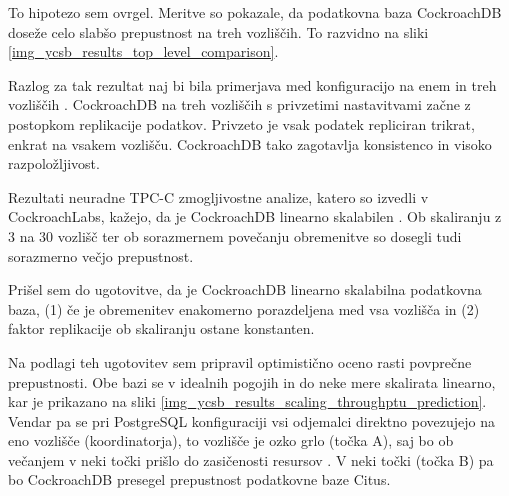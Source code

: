 \documentclass[a4paper, 12pt]{book}
\begin{document}

To hipotezo sem ovrgel. Meritve so pokazale, da podatkovna baza CockroachDB doseže celo slabšo prepustnost na treh vozliščih. To razvidno na sliki \ref{img_ycsb_results_top_level_comparison}.

Razlog za tak rezultat naj bi bila primerjava med konfiguracijo na enem in treh vozliščih \cite{CRDB-YCSB-perf-analisis}. CockroachDB na treh vozliščih s privzetimi nastavitvami začne z postopkom replikacije podatkov. Privzeto je vsak podatek repliciran trikrat, enkrat na vsakem vozlišču. CockroachDB tako zagotavlja konsistenco in visoko razpoložljivost.

Rezultati neuradne TPC-C zmogljivostne analize, katero so izvedli v Co\-ckroachLabs, kažejo, da je CockroachDB linearno skalabilen \cite{CRDB-TPCC-perforamance-report}. Ob skali\-ranju z 3 na 30 vozlišč ter ob sorazmernem povečanju obremenitve so dosegli tudi sorazmerno večjo prepustnost.

Prišel sem do ugotovitve, da je CockroachDB linearno skalabilna podatkovna baza, (1) če je obremenitev enakomerno porazdeljena med vsa vozlišča in (2) faktor replikacije ob skaliranju ostane konstanten.

Na podlagi teh ugotovitev sem pripravil optimistično oceno rasti povprečne prepustnosti. Obe bazi se v idealnih pogojih in do neke mere skalirata linearno, kar je prikazano na sliki \ref{img_ycsb_results_scaling_throughptu_prediction}. Vendar pa se pri PostgreSQL konfiguraciji vsi odjemalci direktno povezujejo na eno vozlišče (koordinatorja), to vozlišče je ozko grlo (točka A), saj bo ob večanjem v neki točki prišlo do zasičenosti resursov \cite{Citus-add-coordinator}. V neki točki (točka B) pa bo CockroachDB presegel prepustnost podatkovne baze Citus.
\end{document}
